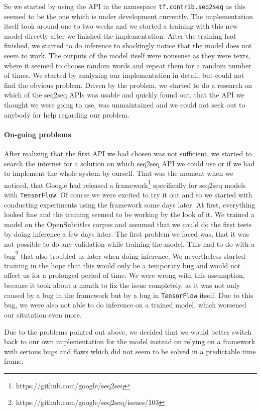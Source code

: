 So we started by using the API in the namespace \texttt{tf.contrib.seq2seq} as this seemed to be the one which is under development currently. The implementation itself took around one to two weeks and we started a training with this new model directly after we finished the implementation. After the training had finished, we started to do inference to shockingly notice that the model does not seem to work. The outputs of the model itself were nonsense as they were texts, where it seemed to choose random words and repeat them for a random number of times. We started by analyzing our implementation in detail, but could not find the obvious problem. Driven by the problem, we started to do a research on which of the seq2seq APIs was usable and quickly found out, that the API we thought we were going to use, was unmaintained and we could not seek out to anybody for help regarding our problem.

\paragraph{On-going problems} After realizing that the first API we had chosen was not sufficient, we started to search the internet for a solution on which seq2seq API we could use or if we had to implement the whole system by ourself. That was the moment when we noticed, that Google had released a framework\footnote{https://github.com/google/seq2seq} specifically for seq2seq models with \texttt{TensorFlow}. Of course we were excited to try it out and so we started with conducting experiments using the framework some days later. At first, everything looked fine and the training seemed to be working by the look of it. We trained a model on the OpenSubtitles corpus and assumed that we could do the first tests by doing inference a few days later. The first problem we faced was, that it was not possible to do any validation while training the model. This had to do with a bug\footnote{https://github.com/google/seq2seq/issues/103} that also troubled us later when doing inference. We nevertheless started training in the hope that this would only be a temporary bug and would not affect us for a prolonged period of time. We were wrong with this assumption, because it took about a month to fix the issue completely, as it was not only caused by a bug in the framework but by a bug in \texttt{TensorFlow} itself. Due to this bug, we were also not able to do inference on a trained model, which worsened our situtation even more.

Due to the problems pointed out above, we decided that we would better switch back to our own implementation for the model instead on relying on a framework with serious bugs and flaws which did not seem to be solved in a predictable time frame.

